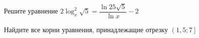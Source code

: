 \begin{ex}
	\begin{condition}
		\begin{enumcols}[label=\asbuk*)]
			\item Решите уравнение \( 2\log_x^ 2 \sqrt{5} = \dfrac{\ln 25\sqrt{5}}{\ln x} - 2  \)
			\item Найдите все корни уравнения, принадлежащие отрезку \( \left(1,5;7\right] \)
		\end{enumcols}
	\end{condition}
\end{ex}